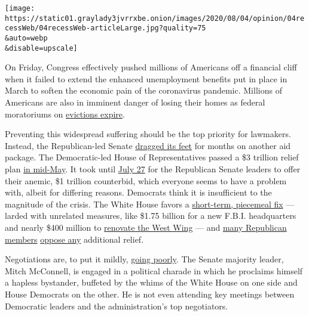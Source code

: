 \texttt{[image: https://static01.graylady3jvrrxbe.onion/images/2020/08/04/opinion/04recessWeb/04recessWeb-articleLarge.jpg?quality=75\\\&auto=webp\\\&disable=upscale]}

On Friday, Congress effectively pushed millions of Americans off a
financial cliff when it failed to extend the enhanced unemployment
benefits put in place in March to soften the economic pain of the
coronavirus pandemic. Millions of Americans are also in imminent danger
of losing their homes as federal moratoriums on
\href{https://www.nytimes3xbfgragh.onion/2020/07/23/opinion/coronavirus-evictions-rent.html}{evictions
expire}.

Preventing this widespread suffering should be the top priority for
lawmakers. Instead, the Republican-led Senate
\href{https://www.nytimes3xbfgragh.onion/2020/07/30/opinion/mitch-mcconnell-coronavirus-economy.html}{dragged
its feet} for months on another aid package. The Democratic-led House of
Representatives passed a \$3 trillion relief plan
\href{https://www.nytimes3xbfgragh.onion/2020/05/15/us/politics/house-simulus-vote.html}{in
mid-May}. It took until
\href{https://www.nytimes3xbfgragh.onion/reuters/2020/07/27/us/politics/27reuters-health-coronavirus-usa-legislation-factbox.html}{July
27} for the Republican Senate leaders to offer their anemic, \$1
trillion counterbid, which everyone seems to have a problem with, albeit
for differing reasons. Democrats think it is insufficient to the
magnitude of the crisis. The White House favors a
\href{https://www.nytimes3xbfgragh.onion/2020/07/29/business/economy/virus-aid-trump.html}{short-term,
piecemeal fix} --- larded with unrelated measures, like \$1.75 billion
for a new F.B.I. headquarters and nearly \$400 million to
\href{https://abcnews.go.com/Politics/wireStory/administration-west-wing-remodel-money-virus-bill-72061451}{renovate
the West Wing} --- and
\href{https://www.nytimes3xbfgragh.onion/2020/07/28/us/politics/coronavirus-relief-bills-house-senate.html}{many
Republican members}
\href{https://www.forbes.com/sites/zackfriedman/2020/07/29/stimulus-package-republicans/\#4ec4dffa1164}{oppose
any} additional relief.

Negotiations are, to put it mildly,
\href{https://www.politico.com/news/2020/08/03/senate-faces-crucial-week-on-coronavirus-relief-talks-390907?nname=playbook\&nid=0000014f-1646-d88f-a1cf-5f46b7bd0000\&nrid=0000014e-f10f-dd93-ad7f-f90fe5eb0000\&nlid=630318}{going
poorly}. The Senate majority leader, Mitch McConnell, is engaged in a
political charade in which he proclaims himself a hapless bystander,
buffeted by the whims of the White House on one side and House Democrats
on the other. He is not even attending key meetings between Democratic
leaders and the administration's top negotiators.

